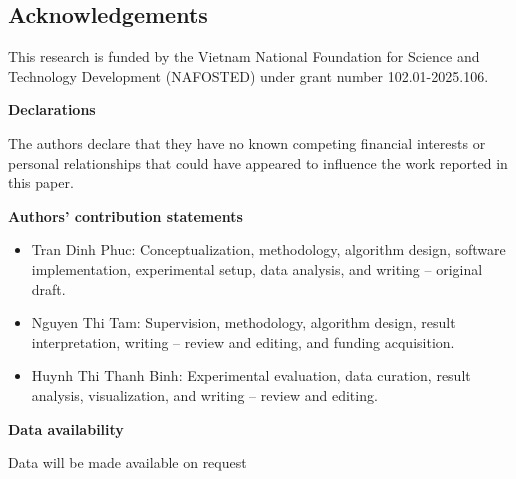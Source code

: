 \documentclass[pdflatex]{sn-jnl}
\begin{document}
\subsection*{Acknowledgements}
This research is funded by the Vietnam National Foundation for Science and Technology Development (NAFOSTED) under grant number 102.01-2025.106.

\newpage	
\begin{appendices}
	\textbf{Declarations}
	
	The authors declare that they have no known competing financial interests or personal relationships that could have appeared to influence the work reported in this paper.
	
	\textbf{Authors’ contribution statements}
	\begin{itemize}
		\item Tran Dinh Phuc: Conceptualization, methodology, algorithm design, software implementation, experimental setup, data analysis, and writing – original draft.
		\item Nguyen Thi Tam: Supervision,  methodology, algorithm design, result interpretation, writing – review and editing, and funding acquisition.
		\item Huynh Thi Thanh Binh: Experimental evaluation, data curation, result analysis, visualization, and writing – review and editing.
	\end{itemize}
	
	\textbf{Data availability}
	
	Data will be made available on request
\end{appendices}
\end{document}

